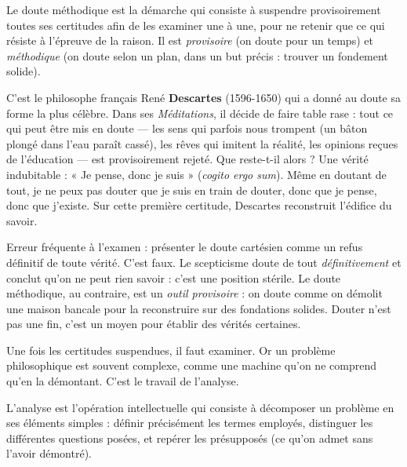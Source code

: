 \documentclass[11pt]{article}
\newcommand{\cle}[1]{{\popxbold\color{popdark}#1}}
\newcounter{popsec}
\newcounter{popsub}
\newcommand{\courssub}[1]{%
  \stepcounter{popsub}%
  \par\vspace{9pt}\noindent{\popxbold\fontsize{11.5}{13}\selectfont\color{popink}{\color{poporange}\thepopsec.\thepopsub}\hspace{6pt}#1}\par\nopagebreak\vspace{4pt}
}
\begin{document}
\begin{definition}
Le \cle{doute méthodique} est la démarche qui consiste à suspendre provisoirement toutes ses certitudes afin de les examiner une à une, pour ne retenir que ce qui résiste à l'épreuve de la raison. Il est \emph{provisoire} (on doute pour un temps) et \emph{méthodique} (on doute selon un plan, dans un but précis : trouver un fondement solide).
\end{definition}

C'est le philosophe français René \textbf{Descartes} (1596-1650) qui a donné au doute sa forme la plus célèbre. Dans ses \emph{Méditations}, il décide de faire table rase : tout ce qui peut être mis en doute — les sens qui parfois nous trompent (un bâton plongé dans l'eau paraît cassé), les rêves qui imitent la réalité, les opinions reçues de l'éducation — est provisoirement rejeté. Que reste-t-il alors ? Une vérité indubitable : « Je pense, donc je suis » (\emph{cogito ergo sum}). Même en doutant de tout, je ne peux pas douter que je suis en train de douter, donc que je pense, donc que j'existe. Sur cette première certitude, Descartes reconstruit l'édifice du savoir.

\begin{attention}
Erreur fréquente à l'examen : présenter le doute cartésien comme un refus définitif de toute vérité. C'est faux. Le \cle{scepticisme} doute de tout \emph{définitivement} et conclut qu'on ne peut rien savoir : c'est une position stérile. Le \cle{doute méthodique}, au contraire, est un \emph{outil provisoire} : on doute comme on démolit une maison bancale pour la reconstruire sur des fondations solides. Douter n'est pas une fin, c'est un moyen pour établir des vérités certaines.
\end{attention}

\courssub{L'analyse : décomposer le problème}

Une fois les certitudes suspendues, il faut examiner. Or un problème philosophique est souvent complexe, comme une machine qu'on ne comprend qu'en la démontant. C'est le travail de l'\cle{analyse}.

\begin{definition}[L'analyse]
L'\cle{analyse} est l'opération intellectuelle qui consiste à décomposer un problème en ses éléments simples : définir précisément les termes employés, distinguer les différentes questions posées, et repérer les \cle{présupposés} (ce qu'on admet sans l'avoir démontré).
\end{definition}
\end{document}
